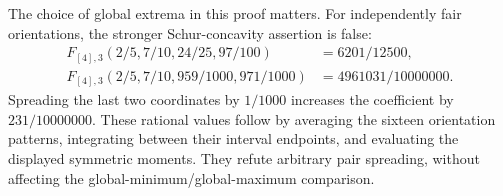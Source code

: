 The choice of global extrema in this proof matters. For independently
fair orientations, the stronger Schur-concavity assertion is false:
\begin{equation}\label{eq:schur-counterexample}
 \begin{split}
 F_{[4],3}(2/5,7/10,24/25,97/100)&=6201/12500,\\
 F_{[4],3}(2/5,7/10,959/1000,971/1000)&=4961031/10000000.
 \end{split}
\end{equation}
Spreading the last two coordinates by $1/1000$ increases the coefficient
by $231/10000000$. These rational values follow by averaging the sixteen
orientation patterns, integrating between their interval endpoints,
and evaluating the displayed symmetric moments. They refute arbitrary
pair spreading, without affecting the global-minimum/global-maximum
comparison.

